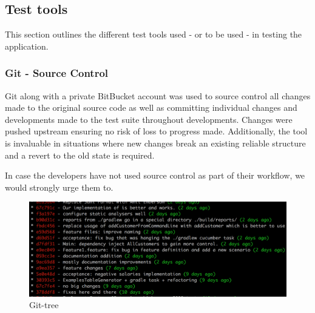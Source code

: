 \subsection{Test tools}
This section outlines the different test tools used - or to be used - in testing the application. 
\subsubsection{Git - Source Control}
Git along with a private BitBucket account was used to source control all changes made to the original source code as well as committing individual changes and developments made to the test suite throughout developments. Changes were pushed upstream ensuring no risk of loss to progress made. Additionally, the tool is invaluable in situations where new changes break an existing reliable structure and a revert to the old state is required. 
\par 
In case the developers have not used source control as part of their workflow, we would strongly urge them to. 

\begin{figure}[H]
\centering
\includegraphics[scale=0.5]{res/git-tree.png}
\caption{Git-tree}
\end{figure}
